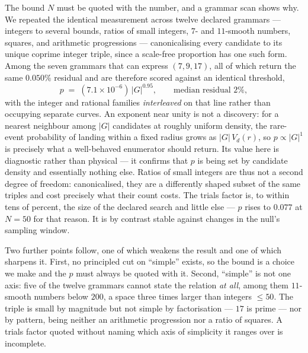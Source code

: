 \documentclass[twocolumn,prd,amsmath,amssymb,floatfix]{revtex4-2}
\begin{document}
The bound $N$ must be quoted with the number, and a grammar scan shows why.  We
repeated the identical measurement across twelve declared grammars --- integers
to several bounds, ratios of small integers, $7$- and $11$-smooth numbers,
squares, and arithmetic progressions --- canonicalising every candidate to its
unique coprime integer triple, since a scale-free proportion has one such form.
Among the seven grammars that can express $(7,9,17)$, all of which return the
same $0.050\%$ residual and are therefore scored against an identical threshold,
\begin{equation}
  p \;=\; (7.1\times10^{-6})\,|G|^{0.95},
  \qquad \text{median residual } 2\% ,
\end{equation}
with the integer and rational families \emph{interleaved} on that line rather
than occupying separate curves.  An exponent near unity is not a discovery: for
a nearest neighbour among $|G|$ candidates at roughly uniform density, the
rare-event probability of landing within a fixed radius grows as $|G|\,V_d(r)$,
so $p \propto |G|^{1}$ is precisely what a well-behaved enumerator should
return.  Its value here is diagnostic rather than physical --- it confirms that
$p$ is being set by candidate density and essentially nothing else.  Ratios of small integers are thus not a second
degree of freedom: canonicalised, they are a differently shaped subset of the
same triples and cost precisely what their count costs.  The trials factor is,
to within tens of percent, the size of the declared search and little else ---
$p$ rises to $0.077$ at $N=50$ for that reason.  It is by contrast stable
against changes in the null's sampling window.

Two further points follow, one of which weakens the result and one of which
sharpens it.  First, no principled cut on ``simple'' exists, so the bound is a
choice we make and the $p$ must always be quoted with it.  Second, ``simple'' is
not one axis: five of the twelve grammars cannot state the relation \emph{at
all}, among them $11$-smooth numbers below $200$, a space three times larger
than integers $\le 50$.  The triple is small by magnitude but not simple by
factorisation --- $17$ is prime --- nor by pattern, being neither an arithmetic
progression nor a ratio of squares.  A trials factor quoted without naming which
axis of simplicity it ranges over is incomplete.
\end{document}
